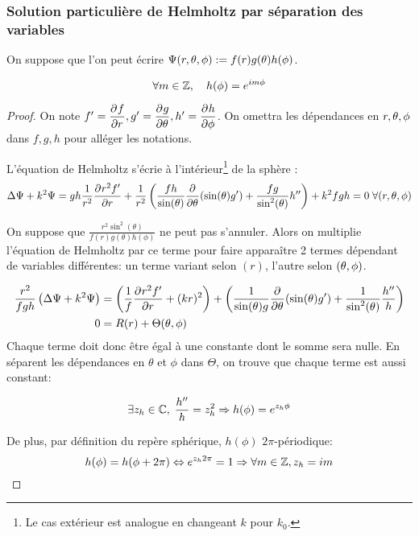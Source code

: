 \subsubsection{Solution particulière de Helmholtz par séparation des variables}
\begin{hyp}
On suppose que l'on peut écrire \(\Psi(\rtp) : = f(r)g(\theta)h(\phi)\).
\end{hyp}
\begin{prop}
\begin{equation}
\forall m \in \ZZ, \quad h(\phi) = e^{im\phi}
\end{equation}
\end{prop}
\begin{proof}
On note \(f' =\ddr{r}{f}, g' = \ddr{\theta}{g} , h' = \ddr{\phi}{h}\). On omettra les dépendances en \(\rtp\) dans \(f,g,h\) pour alléger les notations.

L'équation de Helmholtz s'écrie à l'intérieur\footnote{Le cas extérieur est analogue en changeant \(k\) pour \(k_0\).} de la sphère :
\begin{equation}\label{eq:helm:helm}
  \Delta \Psi + k^2 \Psi = gh\frac{1}{r^2}\ddr{r}{r^2f'} + \frac{1}{r^2}\left(\frac{fh}{\sin(\theta)}\ddr{\theta}{}(\sin(\theta)g')+\frac{fg}{\sin^2(\theta)}h''\right) + k^2 fgh = 0 \; \forall (r,\tp)
\end{equation}

On suppose que \( \frac{r^2\sin^2(\theta)}{f(r)g(\theta)h(\phi)}\) ne peut pas s'annuler. Alors on multiplie l'équation de Helmholtz par ce terme pour faire apparaître 2 termes dépendant de variables différentes: un terme variant selon \((r)\), l'autre selon \((\tp)\).

\begin{align*}
\frac{r^2}{fgh} \left(\Delta \Psi + k^2 \Psi\right) &=
\left(\frac{1}{f}\ddr{r}{r^2f'} + (kr)^2\right) +
\left(\frac{1}{ \sin(\theta)g} \ddr{\theta}{}(\sin(\theta)g') +  \frac{1}{ \sin^2(\theta)}\frac{h''}{h} \right)\\
0 &=R(r) + \Theta(\tp)
\end{align*}
Chaque terme doit donc être égal à une constante dont le somme sera nulle. En séparent les dépendances en \(\theta\) et \(\phi\) dans \(\Theta\), on trouve que chaque terme est aussi constant:

\[
\exists z_h \in \CC,\; \frac{h''}{h} = z_h^2 \Rightarrow h(\phi) = e^{z_h\phi}
\]

De plus, par définition du repère sphérique, \(h(\phi)\) \(2\pi\)-périodique:
\[
h(\phi) = h(\phi + 2\pi) \Leftrightarrow e^{z_h2\pi}= 1 \Rightarrow \forall m \in \ZZ, z_h = im
\]
\end{proof}

